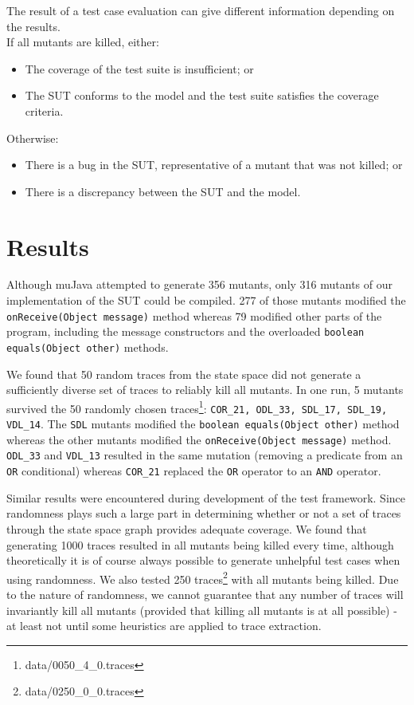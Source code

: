 \documentclass{article}
\begin{document}
			The result of a test case evaluation can give different information depending on the results. \\
			If all mutants are killed, either:
				\begin{itemize}
					\item The coverage of the test suite is insufficient; or
					\item The SUT conforms to the model and the test suite satisfies the coverage criteria.
				\end{itemize}
			Otherwise:
				\begin{itemize}
					\item There is a bug in the SUT, representative of a mutant that was not killed; or
					\item There is a discrepancy between the SUT and the model.
				\end{itemize}

	\section{Results}
		Although muJava attempted to generate 356 mutants, only 316 mutants of our implementation of the SUT could be compiled. 277 of those mutants modified the \texttt{onReceive(Object message)} method whereas 79 modified other parts of the program, including the message constructors and the overloaded \texttt{boolean equals(Object other)} methods.

		We found that 50 random traces from the state space did not generate a sufficiently diverse set of traces to reliably kill all mutants.
		In one run, 5 mutants survived the 50 randomly chosen traces\footnote{data/0050\_4\_0.traces}: \texttt{COR\_21, ODL\_33, SDL\_17, SDL\_19, VDL\_14}. The \texttt{SDL} mutants modified the \texttt{boolean equals(Object other)} method whereas the other mutants modified the \texttt{onReceive(Object message)} method. \texttt{ODL\_33} and \texttt{VDL\_13} resulted in the same mutation (removing a predicate from an \texttt{OR} conditional) whereas \texttt{COR\_21} replaced the \texttt{OR} operator to an \texttt{AND} operator.

		Similar results were encountered during development of the test framework. Since randomness plays such a large part in determining whether or not a set of traces through the state space graph provides adequate coverage. We found that generating 1000 traces resulted in all mutants being killed every time, although theoretically it is of course always possible to generate unhelpful test cases when using randomness. We also tested 250 traces\footnote{data/0250\_0\_0.traces} with all mutants being killed. Due to the nature of randomness, we cannot guarantee that any number of traces will invariantly kill all mutants (provided that killing all mutants is at all possible) \-- at least not until some heuristics are applied to trace extraction.
\end{document}
